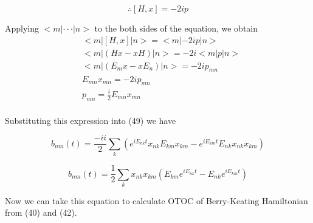 \documentclass[12pt, letterpaper]{article}
\newcommand*{\1}{\hspace{1pt}}
\begin{document}
        \begin{equation}
            \therefore [H,x] = -2ip
        \end{equation}

        Applying $<m|\cdot \cdot \cdot|n>$ to the both sides of the equation, we obtain
        \begin{align*}
            &<m|[H,x]|n> = <m|-2ip|n> \\ 
            &<m|(Hx-xH)|n> = -2i<m|p|n> \\ 
            &<m|(E_{m}x-xE_{n})|n> = -2ip_{mn} \\ 
            &E_{mn}x_{mn} = -2ip_{mn} \\ 
            &p_{mn} = \frac{i}{2}E_{mn}x_{mn} \\  
        \end{align*}

        Substituting this expression into (49) we have 

        \begin{equation*}
            b_{nm}(t) = \frac{-i i}{2}\sum_{k} (e^{i E _{nk}t}x_{nk}E_{km}x_{km} - e^{iE_{km}t}E_{nk}x_{nk}x_{km}) 
        \end{equation*}
        
        \begin{equation}
            b_{nm}(t) = \frac{1}{2}\sum_{k} x_{nk}x_{km}(E_{km}e^{i E _{nk}t} - E_{nk}e^{iE_{km}t}) 
        \end{equation}
        
        Now we can take this equation to calculate OTOC of Berry-Keating Hamiltonian from (40) and (42).
    
    
\end{document}
